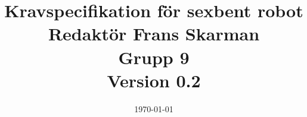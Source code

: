 \documentclass[a4paper,titlepage,12pt]{article}
\begin{document}
    \title{\LARGE
        \textbf{Kravspecifikation för sexbent robot} \\
        \vspace*{0.5\baselineskip}
        \large
        Redaktör Frans Skarman \\
        Grupp 9 \\
        \small
        \vspace*{0.5\baselineskip}
        Version 0.2}

    \date{\today}

	\maketitle
	\newpage

	\tableofcontents
	
	\newpage
	
\end{document}
